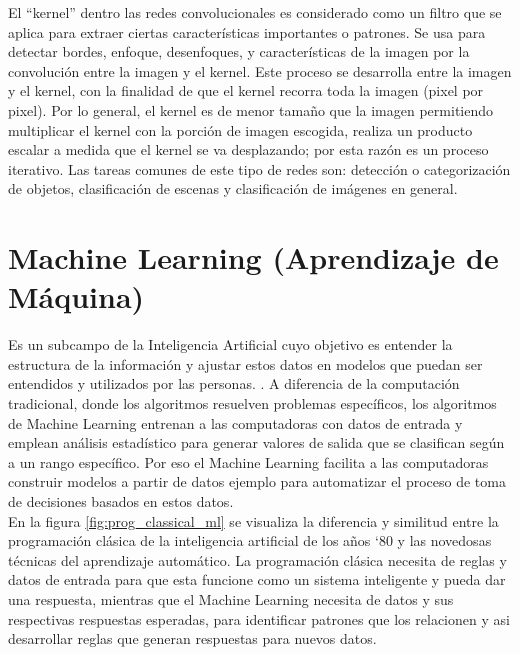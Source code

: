 El ``kernel'' dentro las redes convolucionales es considerado como un filtro que se aplica para extraer ciertas características importantes o patrones. Se usa para detectar bordes, enfoque, desenfoques, y características de la imagen por la convolución entre la imagen y el kernel. Este proceso se desarrolla entre la imagen y el kernel, con la finalidad de que el kernel recorra toda la imagen (pixel por pixel). Por lo general, el kernel es de menor tamaño que la imagen permitiendo multiplicar el kernel con la porción de imagen escogida, realiza un producto escalar a medida que el kernel se va desplazando; por esta razón es un proceso iterativo. Las tareas comunes de este tipo de redes son: detección o categorización de objetos, clasificación de escenas y clasificación de imágenes en general.\\


\section{Machine Learning (Aprendizaje de Máquina)}
Es un subcampo de la Inteligencia Artificial cuyo objetivo es entender la estructura de la información y ajustar estos datos en modelos que puedan ser entendidos y utilizados por las personas. \cite{digitalocean:machinelearning}. A diferencia de la computación tradicional, donde los algoritmos resuelven problemas específicos, los algoritmos de Machine Learning entrenan a las computadoras con datos de entrada y emplean análisis estadístico para generar valores de salida que se clasifican según a un rango específico. Por eso el Machine Learning facilita a las computadoras construir modelos a partir de datos ejemplo para automatizar el proceso de toma de decisiones basados en estos datos.\\

En la figura \ref{fig:prog_classical_ml} se visualiza la diferencia y similitud entre la programación clásica de la inteligencia artificial de los años `80 y las novedosas técnicas del aprendizaje automático. La programación clásica necesita de reglas y datos de entrada para que esta funcione como un sistema inteligente y pueda dar una respuesta, mientras que el Machine Learning necesita de datos y sus respectivas respuestas esperadas, para identificar patrones que los relacionen y asi desarrollar reglas que generan respuestas para nuevos datos.\\

